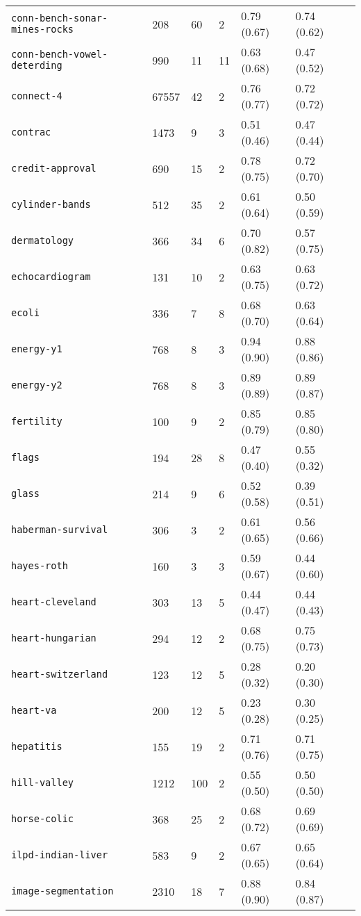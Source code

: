 \begin{tabular}{lllllll}
\verb!conn-bench-sonar-mines-rocks! & 208 & 60 & 2 & 0.79 (0.67) & 0.74 (0.62)\\ 
\verb!conn-bench-vowel-deterding! & 990 & 11 & 11 & 0.63 (0.68) & 0.47 (0.52)\\ 
\verb!connect-4! & 67557 & 42 & 2 & 0.76 (0.77) & 0.72 (0.72)\\ 
\verb!contrac! & 1473 & 9 & 3 & 0.51 (0.46) & 0.47 (0.44)\\ 
\verb!credit-approval! & 690 & 15 & 2 & 0.78 (0.75) & 0.72 (0.70)\\ 
\verb!cylinder-bands! & 512 & 35 & 2 & 0.61 (0.64) & 0.50 (0.59)\\ 
\verb!dermatology! & 366 & 34 & 6 & 0.70 (0.82) & 0.57 (0.75)\\ 
\verb!echocardiogram! & 131 & 10 & 2 & 0.63 (0.75) & 0.63 (0.72)\\ 
\verb!ecoli! & 336 & 7 & 8 & 0.68 (0.70) & 0.63 (0.64)\\ 
\verb!energy-y1! & 768 & 8 & 3 & 0.94 (0.90) & 0.88 (0.86)\\ 
\verb!energy-y2! & 768 & 8 & 3 & 0.89 (0.89) & 0.89 (0.87)\\ 
\verb!fertility! & 100 & 9 & 2 & 0.85 (0.79) & 0.85 (0.80)\\ 
\verb!flags! & 194 & 28 & 8 & 0.47 (0.40) & 0.55 (0.32)\\ 
\verb!glass! & 214 & 9 & 6 & 0.52 (0.58) & 0.39 (0.51)\\ 
\verb!haberman-survival! & 306 & 3 & 2 & 0.61 (0.65) & 0.56 (0.66)\\ 
\verb!hayes-roth! & 160 & 3 & 3 & 0.59 (0.67) & 0.44 (0.60)\\ 
\verb!heart-cleveland! & 303 & 13 & 5 & 0.44 (0.47) & 0.44 (0.43)\\ 
\verb!heart-hungarian! & 294 & 12 & 2 & 0.68 (0.75) & 0.75 (0.73)\\ 
\verb!heart-switzerland! & 123 & 12 & 5 & 0.28 (0.32) & 0.20 (0.30)\\ 
\verb!heart-va! & 200 & 12 & 5 & 0.23 (0.28) & 0.30 (0.25)\\ 
\verb!hepatitis! & 155 & 19 & 2 & 0.71 (0.76) & 0.71 (0.75)\\ 
\verb!hill-valley! & 1212 & 100 & 2 & 0.55 (0.50) & 0.50 (0.50)\\ 
\verb!horse-colic! & 368 & 25 & 2 & 0.68 (0.72) & 0.69 (0.69)\\ 
\verb!ilpd-indian-liver! & 583 & 9 & 2 & 0.67 (0.65) & 0.65 (0.64)\\ 
\verb!image-segmentation! & 2310 & 18 & 7 & 0.88 (0.90) & 0.84 (0.87)\\ 

\end{tabular}
